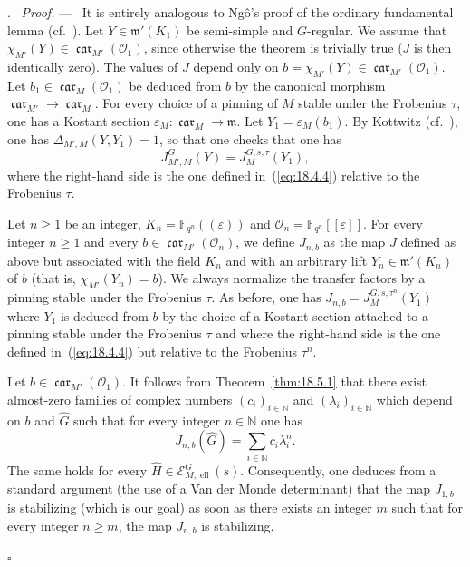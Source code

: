 \documentclass[12pt,a4paper,oneside,english,leqno]{smfart}
\makeatletter
\numberwithin{equation}{subsection}
\newcounter{theo}
\numberwithin{theo}{subsection}
\newenvironment{paragr}[1][]{\medskip\refstepcounter{subsection}%
  \par\noindent\hspace*{\parindent}\thesubsection.\ \emph{#1}%
  \@ifundefined{@empty}{}{}\ignorespaces}{\medskip}
\theoremstyle{plain}
\theoremstyle{definition}
\theoremstyle{remark}
\newenvironment{preuve}[1][]{\medskip\noindent\textit{Proof.} #1 ---\ }%
  {\hfill\ensuremath{\square}\medskip}
\DeclareMathOperator{\el}{ell}
\DeclareMathOperator{\car}{\mathfrak{car}}
\newcommand{\NN}{\mathbb{N}}
\newcommand{\FF}{\mathbb{F}}
\newcommand{\oc}{\mathcal{O}}
\newcommand{\ec}{\mathcal{E}}
\newcommand{\Gc}{\widehat{G}}
\newcommand{\Hc}{\widehat{H}}
\newcommand{\mgo}{\mathfrak{m}}
\newcommand{\la}{\lambda}
\newcommand{\eps}{\varepsilon}
\renewcommand{\geq}{\geqslant}
\makeatother
\begin{document}
\begin{paragr}
\begin{preuve}
It is entirely analogous to Ngô's proof of the ordinary fundamental lemma (cf.\ \cite[\S8.6]{Ngo-lemme}). Let $Y\in\mgo'(K_1)$ be semi-simple and $G$-regular. We assume that $\chi_{M'}(Y)\in\car_{M'}(\oc_1)$, since otherwise the theorem is trivially true ($J$ is then identically zero). The values of $J$ depend only on $b=\chi_{M'}(Y)\in\car_{M'}(\oc_1)$. Let $b_1\in\car_M(\oc_1)$ be deduced from $b$ by the canonical morphism $\car_{M'}\to\car_M$. For every choice of a pinning of $M$ stable under the Frobenius $\tau$, one has a Kostant section $\eps_M:\car_M\to\mgo$. Let $Y_1=\eps_M(b_1)$. By Kottwitz (cf.\ \cite{Kottwitz-transfer}), one has $\Delta_{M',M}(Y,Y_1)=1$, so that one checks that one has
\begin{equation}\label{eq:19.1.1}
J^G_{M',M}(Y)=J^{G,s,\tau}_M(Y_1),
\end{equation}
where the right-hand side is the one defined in~(\ref{eq:18.4.4}) relative to the Frobenius $\tau$.

Let $n\geq 1$ be an integer, $K_n=\FF_{q^n}((\eps))$ and $\oc_n=\FF_{q^n}[[\eps]]$. For every integer $n\geq 1$ and every $b\in\car_{M'}(\oc_n)$, we define $J_{n,b}$ as the map $J$ defined as above but associated with the field $K_n$ and with an arbitrary lift $Y_n\in\mgo'(K_n)$ of $b$ (that is, $\chi_{M'}(Y_n)=b$). We always normalize the transfer factors by a pinning stable under the Frobenius $\tau$. As before, one has $J_{n,b}=J^{G,s,\tau^n}_M(Y_1)$ where $Y_1$ is deduced from $b$ by the choice of a Kostant section attached to a pinning stable under the Frobenius $\tau$ and where the right-hand side is the one defined in~(\ref{eq:18.4.4}) but relative to the Frobenius $\tau^n$.

Let $b\in\car_{M'}(\oc_1)$. It follows from Theorem~\ref{thm:18.5.1} that there exist almost-zero families of complex numbers $(c_i)_{i\in\NN}$ and $(\la_i)_{i\in\NN}$ which depend on $b$ and $\Gc$ such that for every integer $n\in\NN$ one has
$$
J_{n,b}(\Gc)=\sum_{i\in\NN}c_i\la_i^n.
$$
The same holds for every $\Hc\in\ec^G_{M,\el}(s)$. Consequently, one deduces from a standard argument (the use of a Van der Monde determinant) that the map $J_{1,b}$ is stabilizing (which is our goal) as soon as there exists an integer $m$ such that for every integer $n\geq m$, the map $J_{n,b}$ is stabilizing.


\end{preuve}
\end{paragr}
\end{document}
